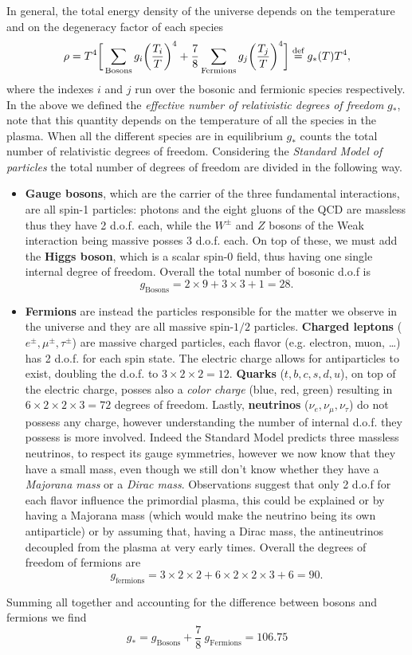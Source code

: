 In general, the total energy density of the universe depends on the temperature and on the degeneracy factor of each species
\begin{equation}
    \rho=T^4\bigg[\sum_{\text{Bosons}}g_i\bigg(\frac{T_i}{T}\bigg)^4+\frac{7}{8}\sum_{\text{Fermions}}g_j\bigg(\frac{T_j}{T}\bigg)^4\bigg]\stackrel{\text{def}}{=} g_{*}(T)T^4, \label{eq:total_energy_density}
\end{equation}
where the indexes $i$ and $j$ run over the bosonic and fermionic species respectively. In the above we defined the \emph{effective number of relativistic degrees of freedom} $g_*$, note that this quantity depends on the temperature of all the species in the plasma. When all the different species are in equilibrium $g_*$ counts the total number of relativistic degrees of freedom. Considering the \emph{Standard Model of particles} the total number of degrees of freedom are divided in the following way.
\begin{itemize}
    \item \textbf{Gauge bosons}, which are the carrier of the three fundamental interactions, are all spin-1 particles: photons and the eight gluons of the QCD are massless thus they have 2 d.o.f. each, while the $W^\pm$ and $Z$ bosons of the Weak interaction being massive posses 3 d.o.f. each. On top of these, we must add the \textbf{Higgs boson}, which is a scalar spin-0 field, thus having one single internal degree of freedom. Overall the total number of bosonic d.o.f is
    $$g_\text{Bosons}=2\times 9+3\times3+1= 28.$$
    \item \textbf{Fermions} are instead the particles responsible for the matter we observe in the universe and they are all massive spin-$1/2$ particles. \textbf{Charged leptons} ($e^\pm,\mu^\pm,\tau^\pm$) are massive charged particles, each flavor (e.g. electron, muon, \dots) has 2 d.o.f. for each spin state. The electric charge allows for antiparticles to exist, doubling the d.o.f. to $3\times2\times2=12$. \textbf{Quarks} ($t,b,c,s,d,u$), on top of the electric charge, posses also a \emph{color charge} (blue, red, green) resulting in $6\times2\times2\times3=72$ degrees of freedom. Lastly, \textbf{neutrinos} ($\nu_e,\nu_\mu,\nu_\tau$) do not possess any charge, however understanding the number of internal d.o.f. they possess is more involved. Indeed the Standard Model predicts three massless neutrinos, to respect its gauge symmetries, however we now know that they have a small mass, even though we still don't know whether they have a \emph{Majorana mass} or a \emph{Dirac mass}. Observations suggest that only 2 d.o.f for each flavor influence the primordial plasma, this could be explained or by having a Majorana mass (which would make the neutrino being its own antiparticle) or by assuming that, having a Dirac mass, the antineutrinos decoupled from the plasma at very early times. Overall the degrees of freedom of fermions are
    $$
    g_\text{fermions}=3\times2\times2+6\times2\times2\times3+6=90.
    $$
\end{itemize}
Summing all together and accounting for the difference between bosons and fermions we find
\begin{equation}
    g_*=g_\text{Bosons} + \frac{7}{8}\ g_\text{Fermions}=106.75
    \label{eq:relativ_dof}
\end{equation}
